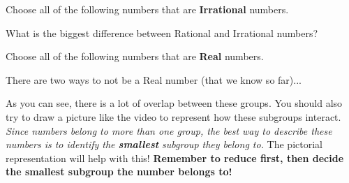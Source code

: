 \documentclass{ximera}
\begin{document}
\begin{exercise}
Choose all of the following numbers that are \textbf{Irrational} numbers.
  \begin{selectAll}
  \end{selectAll}

\begin{hint}
	What is the biggest difference between Rational and Irrational numbers?
\end{hint}
\end{exercise}

\begin{exercise}
Choose all of the following numbers that are \textbf{Real} numbers.
  \begin{selectAll}
  \end{selectAll}

\begin{hint}
	There are two ways to not be a Real number (that we know so far)...
\end{hint}
\end{exercise}

As you can see, there is a lot of overlap between these groups. You should also try to draw a picture like the video to represent how these subgroups interact. \textit{Since numbers belong to more than one group, the best way to describe these numbers is to identify the \textbf{smallest} subgroup they belong to.} The pictorial representation will help with this! \textbf{\Large Remember to reduce first, then decide the smallest subgroup the number belongs to!}
\end{document}

